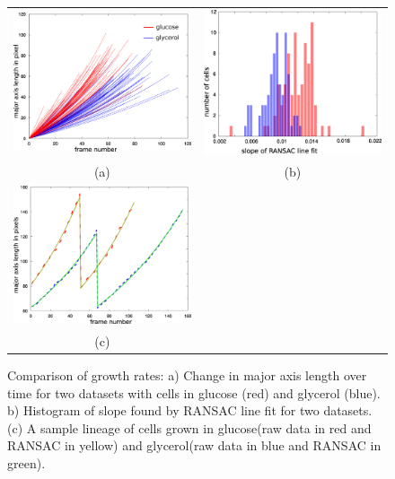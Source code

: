 \documentclass[journal]{IEEEtran}
\begin{document}
\begin{figure}[!h]
	\centering
	\begin{tabular}{c c }
	\includegraphics[width=0.45\linewidth]{growthrateed.png} & \includegraphics[width=0.45\linewidth]{histoed.png} \\
	(a) & (b)\\
	 \includegraphics[width=0.45\linewidth]{lineagebothed.png}&\\
	 (c) &
	\end{tabular}
	\caption{Comparison of growth rates: a) Change in major axis length over time for two datasets with cells in glucose (red) and glycerol (blue). b) Histogram of slope found by RANSAC line fit for two datasets. (c) A sample lineage of  cells grown in glucose(raw data in red and RANSAC in yellow) and glycerol(raw data in blue and RANSAC in green). }
	\label{fig:growthrate}
	
\end{figure}
\end{document}
